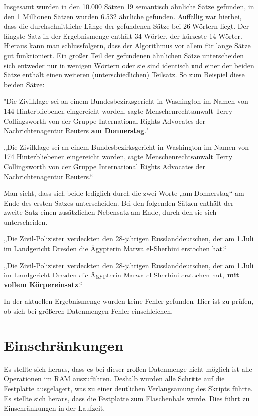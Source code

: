 \documentclass[a4paper,11pt,utf8]{scrartcl}
\begin{document}
Insgesamt wurden in den 10.000 Sätzen 19 semantisch ähnliche Sätze gefunden, in den 1 Millionen Sätzen wurden 6.532 ähnliche gefunden. Auffällig war hierbei, dass die durchschnittliche Länge der gefundenen Sätze bei 26 Wörtern liegt. Der längste Satz in der Ergebnismenge enthält 34 Wörter, der kürzeste 14 Wörter.  Hieraus kann man schlussfolgern, dass der Algorithmus vor allem für lange Sätze gut funktioniert. Ein großer Teil der gefundenen ähnlichen Sätze unterscheiden sich entweder nur in wenigen Wörtern oder sie sind identisch und einer der beiden Sätze enthält einen weiteren (unterschiedlichen) Teilsatz. So zum Beispiel diese beiden Sätze:

"Die Zivilklage sei an einem Bundesbezirksgericht in Washington im Namen von 144 Hinterbliebenen eingereicht worden, sagte Menschenrechtsanwalt Terry Collingsworth von der Gruppe International Rights Advocates der Nachrichtenagentur Reuters \textbf{am Donnerstag}."

„Die Zivilklage sei an einem Bundesbezirksgericht in Washington im Namen von 174 Hinterbliebenen eingereicht worden, sagte Menschenrechtsanwalt Terry Collingsworth von der Gruppe International Rights Advocates der Nachrichtenagentur Reuters.“

Man sieht, dass sich beide lediglich durch die zwei Worte „am Donnerstag“ am Ende des ersten Satzes unterscheiden. Bei den folgenden Sätzen enthält der zweite Satz einen zusätzlichen Nebensatz am Ende, durch den sie sich unterscheiden.

„Die Zivil-Polizisten verdeckten den 28-jährigen Russlanddeutschen, der am 1.Juli im Landgericht Dresden die Ägypterin Marwa el-Sherbini erstochen hat.“

„Die Zivil-Polizisten verdeckten den 28-jährigen Russlanddeutschen, der am 1.Juli im Landgericht Dresden die Ägypterin Marwa el-Sherbini erstochen hat\textbf{, mit vollem Körpereinsatz}.“

In der aktuellen Ergebnismenge wurden keine Fehler gefunden. Hier ist zu prüfen, ob sich bei größeren Datenmengen Fehler einschleichen. 

\section{Einschränkungen}
Es stellte sich heraus, dass es bei dieser großen Datenmenge nicht möglich ist alle Operationen im RAM auszuführen. Deshalb wurden alle Schritte auf die Festplatte ausgelagert, was zu einer deutlichen Verlangsamung des Skripts führte. Es stellte sich heraus, dass die Festplatte zum Flaschenhals wurde. Dies führt zu Einschränkungen in der Laufzeit. 
\end{document}

